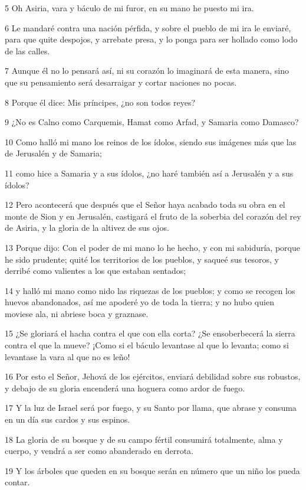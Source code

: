\par 5 Oh Asiria, vara y báculo de mi furor, en su mano he puesto mi ira.
\par 6 Le mandaré contra una nación pérfida, y sobre el pueblo de mi ira le enviaré, para que quite despojos, y arrebate presa, y lo ponga para ser hollado como lodo de las calles. 
\par 7 Aunque él no lo pensará así, ni su corazón lo imaginará de esta manera, sino que su pensamiento será desarraigar y cortar naciones no pocas.
\par 8 Porque él dice: Mis príncipes, ¿no son todos reyes?
\par 9 ¿No es Calno como Carquemis, Hamat como Arfad, y Samaria como Damasco?
\par 10 Como halló mi mano los reinos de los ídolos, siendo sus imágenes más que las de Jerusalén y de Samaria;
\par 11 como hice a Samaria y a sus ídolos, ¿no haré también así a Jerusalén y a sus ídolos?
\par 12 Pero acontecerá que después que el Señor haya acabado toda su obra en el monte de Sion y en Jerusalén, castigará el fruto de la soberbia del corazón del rey de Asiria, y la gloria de la altivez de sus ojos.
\par 13 Porque dijo: Con el poder de mi mano lo he hecho, y con mi sabiduría, porque he sido prudente; quité los territorios de los pueblos, y saqueé sus tesoros, y derribé como valientes a los que estaban sentados;
\par 14 y halló mi mano como nido las riquezas de los pueblos; y como se recogen los huevos abandonados, así me apoderé yo de toda la tierra; y no hubo quien moviese ala, ni abriese boca y graznase.
\par 15 ¿Se gloriará el hacha contra el que con ella corta? ¿Se ensoberbecerá la sierra contra el que la mueve? ¡Como si el báculo levantase al que lo levanta; como si levantase la vara al que no es leño!
\par 16 Por esto el Señor, Jehová de los ejércitos, enviará debilidad sobre sus robustos, y debajo de su gloria encenderá una hoguera como ardor de fuego.
\par 17 Y la luz de Israel será por fuego, y su Santo por llama, que abrase y consuma en un día sus cardos y sus espinos.
\par 18 La gloria de su bosque y de su campo fértil consumirá totalmente, alma y cuerpo, y vendrá a ser como abanderado en derrota.
\par 19 Y los árboles que queden en su bosque serán en número que un niño los pueda contar.
